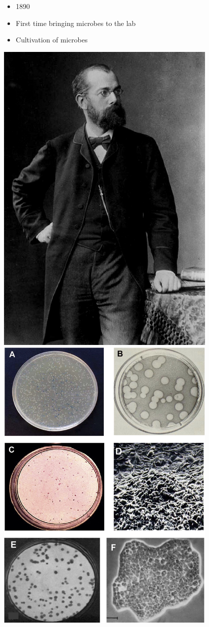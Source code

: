 \documentclass[
]{book}
\providecommand{\tightlist}{%
  \setlength{\itemsep}{0pt}\setlength{\parskip}{0pt}}
\begin{document}
\begin{itemize}
\tightlist
\item
  1890
\item
  First time bringing microbes to the lab
\item
  Cultivation of microbes
\end{itemize}

\includegraphics[width=0.8\textwidth,height=\textheight]{./Figures/koch1.png}
\includegraphics[width=0.8\textwidth,height=\textheight]{./Figures/koch2.png}
\end{document}
